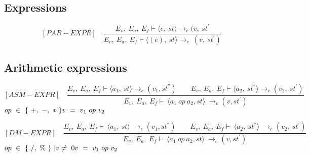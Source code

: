 \subsection{Expressions}
\[	
[PAR-EXPR] \quad	
\dfrac{E_v, \ E_a, \ E_f \vdash \langle e, \ st \rangle \rightarrow_e (v, \ st^{'}}{E_v, \ E_a, \ E_f \vdash \langle (e), \ st \rangle \rightarrow_e \ (v, \ st^{'})}	
\]

\subsection{Arithmetic expressions}
\[
[ASM-EXPR] \quad	
\dfrac{E_v, \ E_a, \ E_f \vdash \langle a_1, \ st \rangle \rightarrow_{e} (v_1, st^{''}) \qquad E_v, \ E_a, \ E_f \vdash \langle a_2, \ st^{''}\rangle \rightarrow_e (v_2, \ st^{'})}{E_v, \ E_a, \ E_f \vdash \ \langle a_1 \ op \ a_2, st \rangle \ \rightarrow_{e} (v, st^{'})}	
\]
\begin{math}		
op \ \in \ \{ \ +, \ -, \ * \ \} \newline		
v \ = \ v_1 \ op \ v_2		
\end{math}

\[
[DM-EXPR] \quad
\dfrac{E_v, \ E_a, \ E_f \vdash \ \langle a_1, \ st \rangle \ \rightarrow_{e} (v_1, st^{''}) \qquad E_v, \ E_a, \ E_f \vdash \ \langle a_2, \ st^{''} \rangle \ \rightarrow_e (v_2, \ st^{'})}{E_v, \ E_a, \ E_f \vdash \ \langle a_1 \ op \ a_2, st \rangle \ \rightarrow_{e} (v, st^{'})}	
\]
\begin{math}		
op \ \in \ \{ \ /, \ \% \ \} \ | v \not= \ 0 \newline 		
v \ = \ v_1 \ op \ v_2		
\end{math} 

